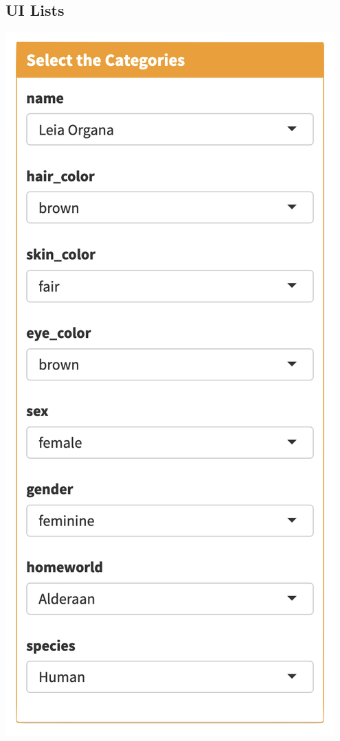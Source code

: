 \documentclass[
  oneside]{book}
\begin{document}
\hypertarget{ui-lists}{%
\subsection{UI Lists}\label{ui-lists}}

\includegraphics{images/structure_ui.png}
\end{document}
